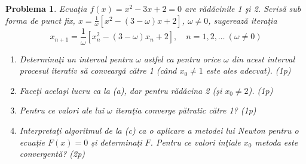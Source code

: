 \documentclass[12pt]{article}%
\newtheorem{problem}[theorem]{Problema}
\begin{document}
\begin{problem}
\label{Gautschip4.41}Ecua\c{t}ia $f(x)=x^{2}-3x+2=0$ are r\u{a}d\u{a}cinile 1
\c{s}i 2. Scris\u{a} sub forma de punct fix, $x=\frac{1}{\omega}\left[
x^{2}-\left(  3-\omega\right)  x+2\right]  $, $\omega\neq0$, sugereaz\u{a}
itera\c{t}ia%
\[
x_{n+1}=\frac{1}{\omega}\left[  x_{n}^{2}-\left(  3-\omega\right)
x_{n}+2\right]  ,\quad n=1,2,\dots~(\omega\neq0)
\]


\begin{enumerate}
\item[(a)] Determina\c{t}i un interval pentru $\omega$ astfel ca pentru orice
$\omega$ din acest interval procesul iterativ s\u{a} convearg\u{a} c\u{a}tre 1
(c\^{a}nd $x_{0}\neq1$ este ales adecvat). (1p)

\item[(b)] Face\c{t}i acela\c{s}i lucru ca la (a), dar pentru r\u{a}d\u{a}cina
2 (\c{s}i $x_{0}\neq2$). (1p)

\item[(c)] Pentru ce valori ale lui $\omega$ itera\c{t}ia converge
p\u{a}tratic c\u{a}tre 1? (1p)

\item[(d)] Interpreta\c{t}i algoritmul de la (c) ca o aplicare a metodei lui
Newton pentru o ecua\c{t}ie $F(x)=0$ \c{s}i determina\c{t}i $F$. Pentru ce
valori in\c{t}iale $x_{0}$ metoda este convergent\u{a}? (2p)
\end{enumerate}
\end{problem}
\end{document}
